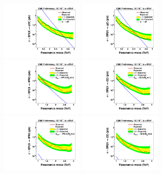 \begin{figure}[h!tpb]
\begin{center}
\includegraphics[width=0.35\textwidth]{EXO-12-024/figs/limits/brazilianFlag_qW_combined.pdf}
\includegraphics[width=0.35\textwidth]{EXO-12-024/figs/limits/brazilianFlag_qZ_combined.pdf}\\
\includegraphics[width=0.35\textwidth]{EXO-12-024/figs/limits/brazilianFlag_RS1WW_combined.pdf}
\includegraphics[width=0.35\textwidth]{EXO-12-024/figs/limits/brazilianFlag_RS1ZZ_combined.pdf}\\
\includegraphics[width=0.35\textwidth]{EXO-12-024/figs/limits/brazilianFlag_BulkWW_combined.pdf}
\includegraphics[width=0.35\textwidth]{EXO-12-024/figs/limits/brazilianFlag_BulkZZ_combined.pdf}\\

\end{center}
\end{figure}
